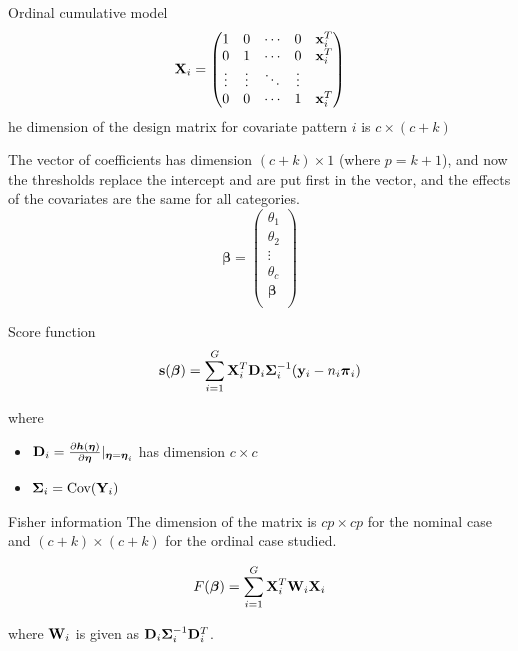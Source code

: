 \documentclass[
  ignorenonframetext,
]{beamer}
\providecommand{\tightlist}{%
  \setlength{\itemsep}{0pt}\setlength{\parskip}{0pt}}
\begin{document}
\begin{frame}
\begin{block}{Ordinal cumulative model}
\label{ordinal-cumulative-model}
\[{\bf X}_i=\begin{pmatrix}1 & 0 & \cdots & 0 & {\bf x}_i^T\\
0 & 1 & \cdots & 0 & {\bf x}_i^T\\
\vdots & \vdots & \ddots & \vdots \\
0 & 0 & \cdots & 1 & {\bf x}_i^T\\
\end{pmatrix}\] he dimension of the design matrix for covariate pattern
\(i\) is \(c \times (c+k)\)

The vector of coefficients has dimension \((c+ k) \times 1\) (where
\(p=k+1\)), and now the thresholds replace the intercept and are put
first in the vector, and the effects of the covariates are the same for
all categories.
\[{\boldsymbol \beta}=\begin{pmatrix}\theta_1\\ \theta_2 \\ \vdots \\ \theta_c \\{\boldsymbol \beta}\\ \end{pmatrix}\]
\end{block}
\end{frame}

\begin{frame}
\begin{block}{Score function}
\label{score-function}
\[{\bf s}({\boldsymbol \beta})=\sum_{i=1}^G {\bf X}_i^T {\bf D}_i {\boldsymbol \Sigma}_i^{-1}({\bf y}_i-n_i{\boldsymbol \pi}_i)\]

where

\begin{itemize}
\tightlist
\item
  \({\bf D}_i=\frac{\partial {\boldsymbol h}({\boldsymbol \eta})}{\partial {\boldsymbol \eta}}\lvert_{ {\boldsymbol \eta}={\boldsymbol \eta}_i}\)
  has dimension \(c \times c\)
\item
  \({\boldsymbol \Sigma}_i=\text{Cov}({\bf Y}_i)\)
\end{itemize}
\end{block}
\end{frame}

\begin{frame}
\begin{block}{Fisher information}
\label{fisher-information}
The dimension of the matrix is \(cp\times cp\) for the nominal case and
\((c+k) \times (c+k)\) for the ordinal case studied.

\[F({\boldsymbol \beta})=\sum_{i=1}^G {\bf X}_i^T {\bf W}_i {\bf X}_i\]

where \({\bf W}_i\) is given as
\({\bf D}_i{\boldsymbol \Sigma}_i^{-1}{\bf D}_i^T\).
\end{block}
\end{frame}
\end{document}
